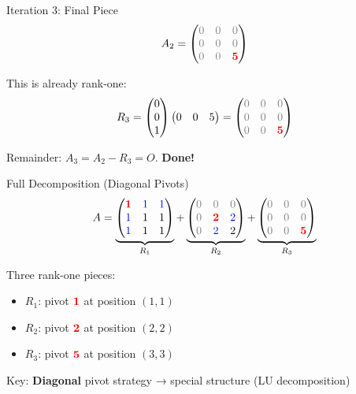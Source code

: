 \documentclass[10pt]{beamer}
\theoremstyle{definition}
\newcommand{\pvt}[1]{{\color{red}\mathbf{#1}}}       %
\newcommand{\crs}[1]{{\color{blue}#1}}                %
\newcommand{\rem}[1]{{\color{gray}#1}}                %
\newcommand{\x}[1]{\alert{\textbf{#1}}}
\begin{document}
\begin{frame}{Iteration 3: Final Piece}
$$A_2 = \begin{pmatrix}
\rem{0} & \rem{0} & \rem{0} \\
\rem{0} & \rem{0} & \rem{0} \\
\rem{0} & \rem{0} & \pvt{5}
\end{pmatrix}$$

\vfill
This is already rank-one:
$$R_3 = \begin{pmatrix} 0 \\ 0 \\ 1 \end{pmatrix}
\begin{pmatrix} 0 & 0 & 5 \end{pmatrix}
= \begin{pmatrix}
\rem{0} & \rem{0} & \rem{0} \\
\rem{0} & \rem{0} & \rem{0} \\
\rem{0} & \rem{0} & \pvt{5}
\end{pmatrix}$$

Remainder: $A_3 = A_2 - R_3 = O$. \quad \x{Done!}
\end{frame}

\begin{frame}{Full Decomposition (Diagonal Pivots)}
$$A = \underbrace{\begin{pmatrix}
\pvt{1} & \crs{1} & \crs{1} \\
\crs{1} & 1 & 1 \\
\crs{1} & 1 & 1
\end{pmatrix}}_{R_1}
+ \underbrace{\begin{pmatrix}
\rem{0} & \rem{0} & \rem{0} \\
\rem{0} & \pvt{2} & \crs{2} \\
\rem{0} & \crs{2} & 2
\end{pmatrix}}_{R_2}
+ \underbrace{\begin{pmatrix}
\rem{0} & \rem{0} & \rem{0} \\
\rem{0} & \rem{0} & \rem{0} \\
\rem{0} & \rem{0} & \pvt{5}
\end{pmatrix}}_{R_3}$$

\vfill
Three rank-one pieces:
\begin{itemize}
\item $R_1$: pivot $\pvt{1}$ at position $(1,1)$
\item $R_2$: pivot $\pvt{2}$ at position $(2,2)$
\item $R_3$: pivot $\pvt{5}$ at position $(3,3)$
\end{itemize}

\vfill
Key: \x{Diagonal} pivot strategy → special structure (LU decomposition)
\end{frame}
\end{document}
